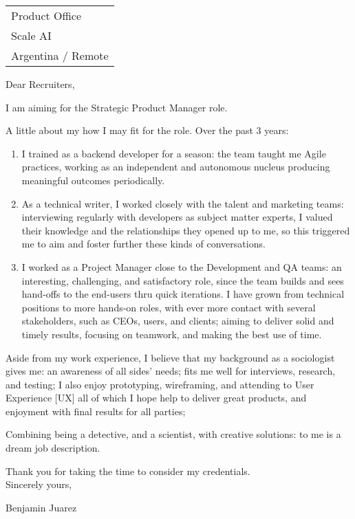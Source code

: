 \hfill%
\bigskip %

\begin{tabular}{@{} l}
    Product Office \\ %
    Scale AI     \\ 
    Argentina / Remote 
\end{tabular}

\bigskip 

Dear Recruiters,

I am aiming for the Strategic Product Manager role.

A little about my 
how I may fit for the role.
Over 
the 
past 3 years:

\begin{enumerate}
\item 
I trained as a backend developer for a season: 
the team taught me Agile practices, working as an independent
and autonomous nucleus producing meaningful outcomes periodically.
\item 
As a technical writer, I worked closely with the talent and
marketing teams: interviewing regularly with developers as subject
matter experts, I valued their knowledge and the relationships they
opened up to me, so this triggered me to aim and foster further these
kinds of conversations.
\item 
I worked as a Project Manager close to the
Development and QA teams: 
an interesting, challenging, and satisfactory role, 
since the team builds and sees hand-offs to the end-users thru quick iterations. 
I have grown from technical positions to more hands-on
roles, with ever more contact with several stakeholders, such as CEOs,
users, and clients; aiming to deliver solid and timely results, focusing
on teamwork, and making the best use of time.
\end{enumerate}

Aside from my work experience, 
I believe that my background as a sociologist gives me:
% 
  an awareness of all sides' needs;
  fits me well for interviews, research, and testing;
  I also enjoy prototyping, wireframing, and attending to User
  Experience {[}UX{]} all of which I hope help to deliver great
  products, and enjoyment with final results for all parties;

Combining being a detective, and a scientist, with creative solutions:
  to me is a dream job description.

\vspace{-\topsep}

Thank you for taking the time to consider my credentials.\\
Sincerely yours,

Benjamin Juarez
